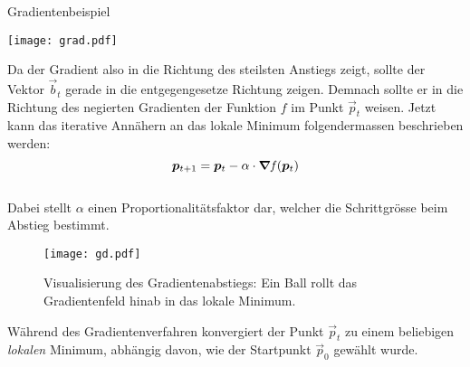 \begin{appendices}
\begin{examplebox}{Gradientenbeispiel}
  \begin{center}
    \texttt{[image: grad.pdf]}
  \end{center}
\end{examplebox}
\para{}
Da der Gradient also in die Richtung des steilsten Anstiegs zeigt, sollte der Vektor
$\vec{b}_t$ gerade in die entgegengesetze Richtung zeigen. Demnach sollte er in die Richtung des negierten Gradienten der Funktion $f$ im Punkt $\vec{p}_t$ weisen.
Jetzt kann das iterative Annähern an das lokale Minimum folgendermassen beschrieben
werden:
\\
\begin{equation}\label{eq:gradientdescent}
  \bm{p}_{t+1} = \bm{p}_t - \alpha \cdot \bm{\nabla} \mathit{f}(\bm{p}_t)
\end{equation}
\\
Dabei stellt $\alpha$ einen Proportionalitätsfaktor dar, welcher die
Schrittgrösse beim Abstieg bestimmt.

\ifcp%
\begin{figure}[h!]
  \centering
  \texttt{[image: gd.pdf]}
  \caption{Visualisierung des Gradientenabstiegs: Ein Ball rollt das
    Gradientenfeld hinab in das lokale Minimum.}
\end{figure}
\fi%

Während des Gradientenverfahren konvergiert der Punkt $\vec{p}_t$ zu einem
beliebigen \textit{lokalen} Minimum, abhängig davon, wie der Startpunkt
$\vec{p}_0$ gewählt wurde.

\cite{book:hands-on}
\cite{Nielsen}


\end{appendices}
